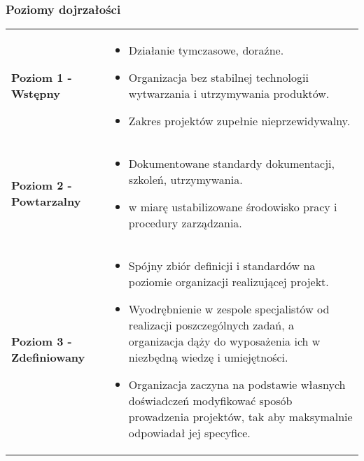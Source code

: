\documentclass[a4paper]{article}
\begin{document}
    \subsubsection{Poziomy dojrzałości}
    \begin{table}[H]
        \begin{center}
            \begin{tabular}{ p{8cm} p{8cm} }
                \textbf{Poziom 1 - Wstępny}
                &
                \begin{itemize}
                    \item Działanie tymczasowe, doraźne.
                    \item Organizacja bez stabilnej technologii wytwarzania i utrzymywania produktów.
                    \item Zakres projektów zupełnie nieprzewidywalny.
                \end{itemize}
                \\

                \textbf{Poziom 2 - Powtarzalny}
                &
                \begin{itemize}
                    \item Dokumentowane standardy dokumentacji, szkoleń, utrzymywania.
                    \item w miarę ustabilizowane środowisko pracy i procedury zarządzania.
                \end{itemize}
                \\

                \textbf{Poziom 3 - Zdefiniowany}
                &
                \begin{itemize}
                    \item Spójny zbiór definicji i standardów na poziomie
                    organizacji realizującej projekt.
                    \item Wyodrębnienie w zespole specjalistów od realizacji
                    poszczególnych zadań, a organizacja dąży do wyposażenia ich
                    w niezbędną wiedzę i umiejętności.
                    \item Organizacja zaczyna na podstawie własnych doświadczeń
                    modyfikować sposób prowadzenia projektów, tak aby
                    maksymalnie odpowiadał jej specyfice.
                \end{itemize}
                \\


\end{tabular}
\end{center}
\end{table}
\end{document}
